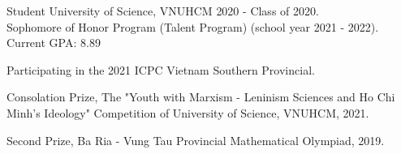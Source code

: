 \documentclass[11pt]{spidercv}
\begin{document}
\begin{MainPart}
    
    \Experience
        {\ColorHighlight}
		{Student}
		{University of Science, VNUHCM}
        {2020 - \faUndo}
        {   
            Class of 2020.\\
            Sophomore of Honor Program (Talent Program) (school year 2021 - 2022).\\
            Current GPA: 8.89
            }

    \vspace*{0.5cm}
        \begin{ItemList}{\ColorHighlight}
            \item [] Participating in the 2021 ICPC Vietnam Southern Provincial.
            \item [] Consolation Prize, The "Youth with Marxism - Leninism Sciences and Ho Chi Minh's Ideology" Competition of University of Science, VNUHCM, 2021.
            \item [] Second Prize, Ba Ria - Vung Tau Provincial Mathematical Olympiad, 2019.
        \end{ItemList}
        

    \end{MainPart}

    
\end{document}
